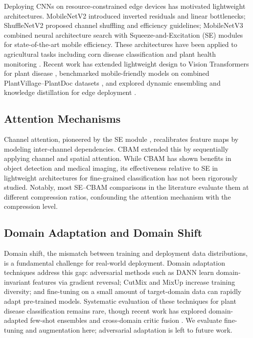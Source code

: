 \documentclass[preprint,12pt]{elsarticle}
\begin{document}
Deploying CNNs on resource-constrained edge devices has motivated lightweight architectures. MobileNetV2 \cite{Sandler2018} introduced inverted residuals and linear bottlenecks; ShuffleNetV2 \cite{Ma2018} proposed channel shuffling and efficiency guidelines; MobileNetV3 \cite{Howard2019} combined neural architecture search with Squeeze-and-Excitation (SE) modules for state-of-the-art mobile efficiency. These architectures have been applied to agricultural tasks including corn disease classification \cite{Syaharani2023} and plant health monitoring \cite{Maharani2025}. Recent work has extended lightweight design to Vision Transformers for plant disease \cite{Tonmoy2025}, benchmarked mobile-friendly models on combined PlantVillage--PlantDoc datasets \cite{Kumar2025}, and explored dynamic ensembling and knowledge distillation for edge deployment \cite{Moges2026, Moummad2026}.

\subsection{Attention Mechanisms}

Channel attention, pioneered by the SE module \cite{Hu2018}, recalibrates feature maps by modeling inter-channel dependencies. CBAM \cite{Woo2018} extended this by sequentially applying channel and spatial attention. While CBAM has shown benefits in object detection \cite{Zhang2022_lettuce} and medical imaging, its effectiveness relative to SE in lightweight architectures for fine-grained classification has not been rigorously studied. Notably, most SE--CBAM comparisons in the literature evaluate them at different compression ratios, confounding the attention mechanism with the compression level.

\subsection{Domain Adaptation and Domain Shift}

Domain shift, the mismatch between training and deployment data distributions, is a fundamental challenge for real-world deployment. Domain adaptation techniques address this gap: adversarial methods such as DANN \cite{Ganin2016} learn domain-invariant features via gradient reversal; CutMix and MixUp increase training diversity; and fine-tuning on a small amount of target-domain data can rapidly adapt pre-trained models. Systematic evaluation of these techniques for plant disease classification remains rare, though recent work has explored domain-adapted few-shot ensembles \cite{Islam2025} and cross-domain critic fusion \cite{Ahmed2025}. We evaluate fine-tuning and augmentation here; adversarial adaptation is left to future work.
\end{document}
